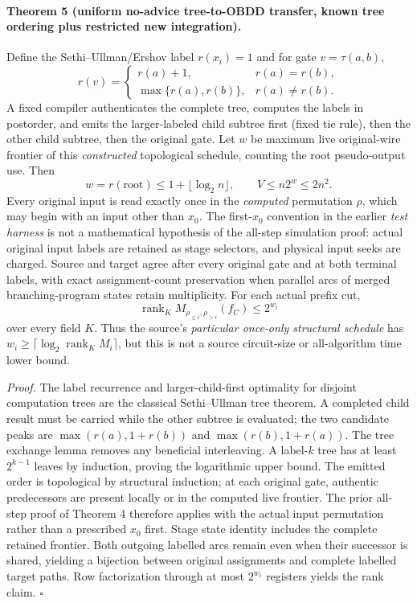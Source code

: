 \documentclass[11pt]{article}
\begin{document}
\paragraph{Theorem 5 (uniform no-advice tree-to-OBDD transfer, known tree ordering plus restricted new integration).}
Define the Sethi--Ullman/Ershov label $r(x_i)=1$ and for gate $v=\tau(a,b)$,
\[
r(v)=\begin{cases}r(a)+1,&r(a)=r(b),\\
\max\{r(a),r(b)\},&r(a)\ne r(b).
\end{cases}
\]
A fixed compiler authenticates the complete tree, computes the labels in postorder, and emits the larger-labeled child subtree first (fixed tie rule), then the other child subtree, then the original gate. Let $w$ be maximum live original-wire frontier of this \emph{constructed} topological schedule, counting the root pseudo-output use. Then
\[
w=r(\mathrm{root})\le1+\lfloor\log_2n\rfloor,\qquad
V\le n2^w\le2n^2.
\]
Every original input is read exactly once in the \emph{computed} permutation $\rho$, which may begin with an input other than $x_0$. The first-$x_0$ convention in the earlier \emph{test harness} is not a mathematical hypothesis of the all-step simulation proof: actual original input labels are retained as stage selectors, and physical input seeks are charged. Source and target agree after every original gate and at both terminal labels, with exact assignment-count preservation when parallel arcs of merged branching-program states retain multiplicity. For each actual prefix cut,
\[
\operatorname{rank}_K M_{\rho_{\le i},\rho_{>i}}(f_C)
\le2^{w_i}
\]
over every field $K$. Thus the source's \emph{particular once-only structural schedule} has $w_i\ge\lceil\log_2\operatorname{rank}_K M_i\rceil$, but this is not a source circuit-size or all-algorithm time lower bound.

\emph{Proof.}
The label recurrence and larger-child-first optimality for disjoint computation trees are the classical Sethi--Ullman tree theorem. A completed child result must be carried while the other subtree is evaluated; the two candidate peaks are $\max(r(a),1+r(b))$ and $\max(r(b),1+r(a))$. The tree exchange lemma removes any beneficial interleaving. A label-$k$ tree has at least $2^{k-1}$ leaves by induction, proving the logarithmic upper bound. The emitted order is topological by structural induction; at each original gate, authentic predecessors are present locally or in the computed live frontier. The prior all-step proof of Theorem 4 therefore applies with the actual input permutation rather than a prescribed $x_0$ first. Stage state identity includes the complete retained frontier. Both outgoing labelled arcs remain even when their successor is shared, yielding a bijection between original assignments and complete labelled target paths. Row factorization through at most $2^{w_i}$ registers yields the rank claim. \hfill$\square$
\end{document}

